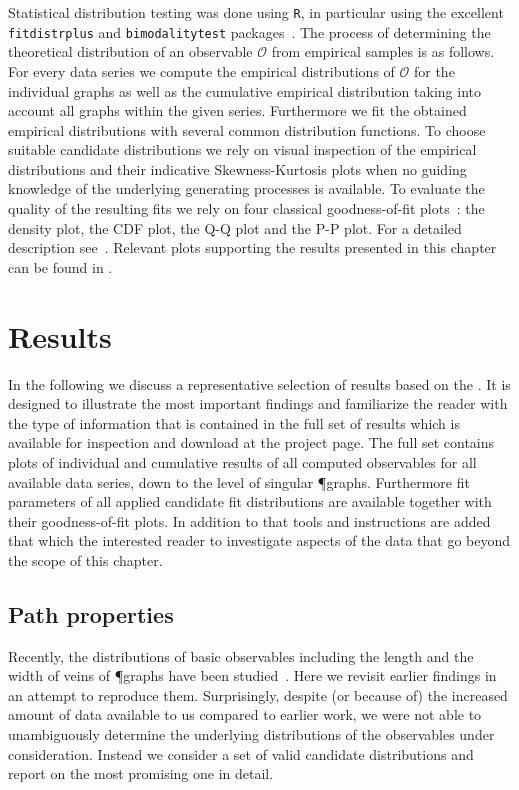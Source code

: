 		Statistical distribution testing was done using \verb+R+, in particular using the excellent \verb+fitdistrplus+ and \verb+bimodalitytest+ packages~\cite{delignette2015fitdistrplus}. The process of determining the theoretical distribution of an observable $\mathcal{O}$ from empirical samples is as follows. For every data series we compute the empirical distributions of $\mathcal{O}$ for the individual graphs as well as the cumulative empirical distribution taking into account all graphs within the given series. Furthermore we fit the obtained empirical distributions with several common distribution functions. To choose suitable candidate distributions we rely on visual inspection of the empirical distributions and their indicative Skewness-Kurtosis plots when no guiding knowledge of the underlying generating processes is available. To evaluate the quality of the resulting fits we rely on four classical goodness-of-fit plots~\cite{cullen1999probabilistic}: the density plot, the CDF plot, the Q-Q plot and the P-P plot. For a detailed description see~\cite{delignette2015fitdistrplus}. Relevant plots supporting the results presented in this chapter can be found in .
		
\section{Results}\label{sec:analysis_results}

	In the following we discuss a representative selection of results based on the \data. It is designed to illustrate the most important findings and familiarize the reader with the type of information that is contained in the full set of results which is available for inspection and download at the \SMGR project page. The full set contains plots of individual and cumulative results of all computed observables for all available data series, down to the level of singular \P graphs. Furthermore fit parameters of all applied candidate fit distributions are available together with their goodness-of-fit plots. In addition to that tools and instructions are added that which the interested reader to investigate aspects of the data that go beyond the scope of this chapter.

	\subsection{Path properties}

		Recently, the distributions of basic observables including the length and the width of veins of \P graphs have been studied~\cite{baumgarten2010plasmodial}. Here we revisit earlier findings in an attempt to reproduce them. Surprisingly, despite (or because of) the increased amount of data available to us compared to earlier work, we were not able to unambiguously determine the underlying distributions of the observables under consideration. Instead we consider a set of valid candidate distributions and report on the most promising one in detail. 

